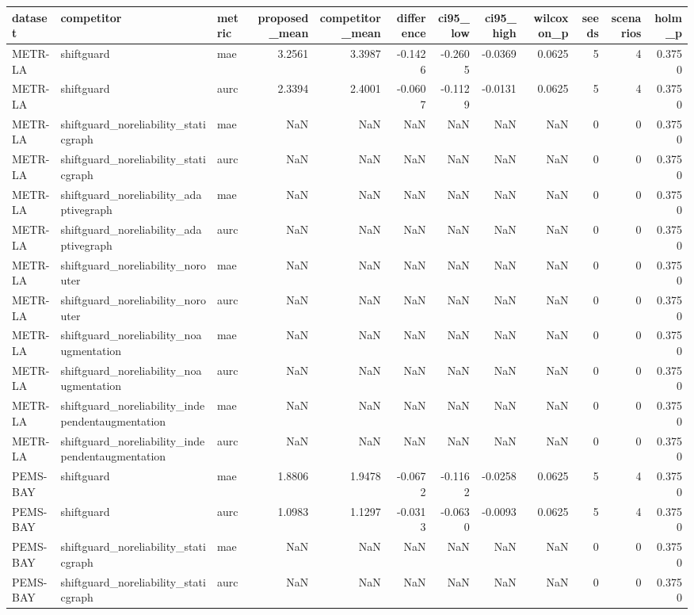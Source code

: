 \begin{tabular}{lllrrrrrrrrr}
\toprule
dataset & competitor & metric & proposed\_mean & competitor\_mean & difference & ci95\_low & ci95\_high & wilcoxon\_p & seeds & scenarios & holm\_p \\
\midrule
METR-LA & shiftguard & mae & 3.2561 & 3.3987 & -0.1426 & -0.2605 & -0.0369 & 0.0625 & 5 & 4 & 0.3750 \\
METR-LA & shiftguard & aurc & 2.3394 & 2.4001 & -0.0607 & -0.1129 & -0.0131 & 0.0625 & 5 & 4 & 0.3750 \\
METR-LA & shiftguard\_noreliability\_staticgraph & mae & NaN & NaN & NaN & NaN & NaN & NaN & 0 & 0 & 0.3750 \\
METR-LA & shiftguard\_noreliability\_staticgraph & aurc & NaN & NaN & NaN & NaN & NaN & NaN & 0 & 0 & 0.3750 \\
METR-LA & shiftguard\_noreliability\_adaptivegraph & mae & NaN & NaN & NaN & NaN & NaN & NaN & 0 & 0 & 0.3750 \\
METR-LA & shiftguard\_noreliability\_adaptivegraph & aurc & NaN & NaN & NaN & NaN & NaN & NaN & 0 & 0 & 0.3750 \\
METR-LA & shiftguard\_noreliability\_norouter & mae & NaN & NaN & NaN & NaN & NaN & NaN & 0 & 0 & 0.3750 \\
METR-LA & shiftguard\_noreliability\_norouter & aurc & NaN & NaN & NaN & NaN & NaN & NaN & 0 & 0 & 0.3750 \\
METR-LA & shiftguard\_noreliability\_noaugmentation & mae & NaN & NaN & NaN & NaN & NaN & NaN & 0 & 0 & 0.3750 \\
METR-LA & shiftguard\_noreliability\_noaugmentation & aurc & NaN & NaN & NaN & NaN & NaN & NaN & 0 & 0 & 0.3750 \\
METR-LA & shiftguard\_noreliability\_independentaugmentation & mae & NaN & NaN & NaN & NaN & NaN & NaN & 0 & 0 & 0.3750 \\
METR-LA & shiftguard\_noreliability\_independentaugmentation & aurc & NaN & NaN & NaN & NaN & NaN & NaN & 0 & 0 & 0.3750 \\
PEMS-BAY & shiftguard & mae & 1.8806 & 1.9478 & -0.0672 & -0.1162 & -0.0258 & 0.0625 & 5 & 4 & 0.3750 \\
PEMS-BAY & shiftguard & aurc & 1.0983 & 1.1297 & -0.0313 & -0.0630 & -0.0093 & 0.0625 & 5 & 4 & 0.3750 \\
PEMS-BAY & shiftguard\_noreliability\_staticgraph & mae & NaN & NaN & NaN & NaN & NaN & NaN & 0 & 0 & 0.3750 \\
PEMS-BAY & shiftguard\_noreliability\_staticgraph & aurc & NaN & NaN & NaN & NaN & NaN & NaN & 0 & 0 & 0.3750 \\

\end{tabular}
